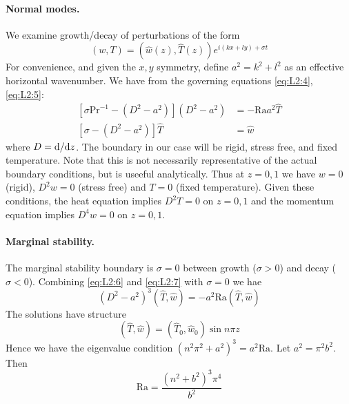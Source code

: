 \documentclass{jknotes}
\begin{document}
\paragraph{Normal modes.} We examine growth/decay of perturbations of the form
\begin{equation}
	(w,T) = (\hat{w}(z),\hat{T}(z))e^{i(kx+ly)+\sigma t}
\end{equation}
For convenience, and given the $x, y$ symmetry, define $a^2 = k^2 + l^2$ as an
effective horizontal wavenumber. We have from the governing equations
\eqref{eq:L2:4}, \eqref{eq:L2:5}:
\begin{align}
	\left[\sigma \text{Pr}^{-1} - (D^2 - a^2)\right](D^2-a^2) &= -\text{Ra}
	a^2 \hat{T} \label{eq:L2:6}\\
	\left[ \sigma - (D^2 - a^2) \right] \hat{T} &= \hat{w} \label{eq:L2:7}
\end{align}
where $D = \diffd/\diffd z$. The boundary in our case will be
rigid, stress free, and fixed temperature. Note that this is not necessarily
representative of the actual boundary conditions, but is useeful analytically.
 Thus at $z= 0, 1$ we have $w = 0$ (rigid), $D^2 w = 0$ (stress free) and $T=
 0 $ (fixed temperature). Given these conditions, the heat equation implies
 $D^2 T = 0$ on $z=0,1$ and the momentum equation implies $D^4 w = 0$ on
 $z=0,1$. 

 \paragraph{Marginal stability.} The marginal stability boundary is $\sigma =
 0$ between growth ($\sigma > 0$) and decay ($\sigma < 0$). Combining
 \eqref{eq:L2:6} and \eqref{eq:L2:7} with $\sigma = 0$ we hae
 \begin{equation}
	 (D^2 - a^2)^3 (\hat{T},\hat{w}) = -a^2 \text{Ra}(\hat{T},\hat{w})
 \end{equation}
 The solutions have structure 
 \begin{equation}
	 (\hat{T}, \hat{w}) =  (\hat{T}_0, \hat{w}_0) \sin n \pi z
 \end{equation}
 Hence we have the eigenvalue condition $(n^2 \pi^2 + a^2)^3 = a^2 \text{Ra}$.
 Let $a^2 = \pi^2 b^2$. Then
 \begin{equation}
	 \text{Ra} = \frac{(n^2 + b^2)^3 \pi^4}{b^2}
 \end{equation}
\end{document}
